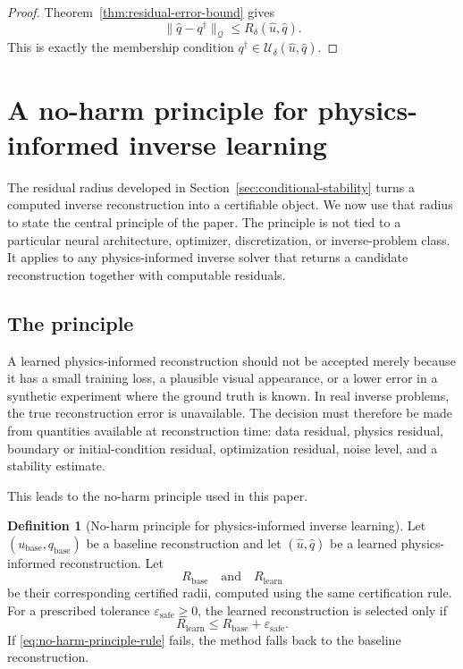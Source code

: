 \documentclass{article}
\numberwithin{equation}{section}
\theoremstyle{definition}
\newtheorem{definition}{Definition}
\begin{document}
\begin{proof}
Theorem~\ref{thm:residual-error-bound} gives
\[
\|\widehat q-q^\dagger\|_{\mathcal Q}
\le
R_\delta(\widehat u,\widehat q).
\]
This is exactly the membership condition \(q^\dagger\in\mathcal U_\delta(\widehat u,\widehat q)\).
\end{proof}


\section{A no-harm principle for physics-informed inverse learning}
\label{sec:no-harm}

The residual radius developed in Section~\ref{sec:conditional-stability} turns a computed inverse reconstruction into a certifiable object. We now use that radius to state the central principle of the paper. The principle is not tied to a particular neural architecture, optimizer, discretization, or inverse-problem class. It applies to any physics-informed inverse solver that returns a candidate reconstruction together with computable residuals.

\subsection{The principle}

A learned physics-informed reconstruction should not be accepted merely because it has a small training loss, a plausible visual appearance, or a lower error in a synthetic experiment where the ground truth is known. In real inverse problems, the true reconstruction error is unavailable. The decision must therefore be made from quantities available at reconstruction time: data residual, physics residual, boundary or initial-condition residual, optimization residual, noise level, and a stability estimate.

This leads to the no-harm principle used in this paper.

\begin{definition}[No-harm principle for physics-informed inverse learning]
\label{def:no-harm-principle}
Let \((u_{\mathrm{base}},q_{\mathrm{base}})\) be a baseline reconstruction and let \((\widehat u,\widehat q)\) be a learned physics-informed reconstruction. Let
\[
R_{\mathrm{base}}
\quad\text{and}\quad
R_{\mathrm{learn}}
\]
be their corresponding certified radii, computed using the same certification rule. For a prescribed tolerance \(\varepsilon_{\mathrm{safe}}\ge0\), the learned reconstruction is selected only if
\begin{equation}
R_{\mathrm{learn}}
\le
R_{\mathrm{base}}+\varepsilon_{\mathrm{safe}}.
\label{eq:no-harm-principle-rule}
\end{equation}
If \eqref{eq:no-harm-principle-rule} fails, the method falls back to the baseline reconstruction.
\end{definition}
\end{document}

